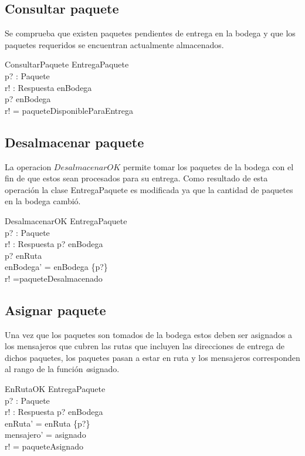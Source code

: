 \documentclass[12pt,a4paper]{article}
\begin{document}
\subsection{Consultar paquete}

Se comprueba que existen paquetes pendientes de entrega en la bodega y que los paquetes requeridos se encuentran actualmente almacenados.

\begin{schema}{ConsultarPaquete}
\Xi EntregaPaquete\\
p? : Paquete\\
r! : Respuesta
\where
enBodega \neq \emptyset\\
p? \in enBodega\\
r! = paqueteDisponibleParaEntrega
\end{schema}

\subsection{Desalmacenar paquete}

La operacion $DesalmacenarOK$ permite tomar los paquetes de la bodega con el fin de que estos sean procesados para su entrega. Como resultado de esta operación la clase EntregaPaquete es modificada ya que la cantidad de paquetes en la bodega cambió.

\begin{schema}{DesalmacenarOK}
\Delta EntregaPaquete\\
p? : Paquete\\
r! : Respuesta
\where
p? \in enBodega\\
p? \notin  enRuta\\
enBodega' = enBodega \setminus \{p?\}\\
r! =paqueteDesalmacenado
\end{schema}

\subsection{Asignar paquete}

Una vez que los paquetes son tomados de la bodega estos deben ser asignados a los mensajeros que cubren las rutas que incluyen las direcciones de entrega de dichos paquetes, los paquetes pasan a estar en ruta y los mensajeros corresponden al rango de la función \textit asignado. 

\begin{schema}{EnRutaOK}
\Delta EntregaPaquete\\
p? : Paquete\\
r! : Respuesta
\where
p? \notin  enBodega\\
enRuta' = enRuta \cup \{p?\}\\
mensajero' = \ran asignado\\
r! = paqueteAsignado
\end{schema}
\end{document}
